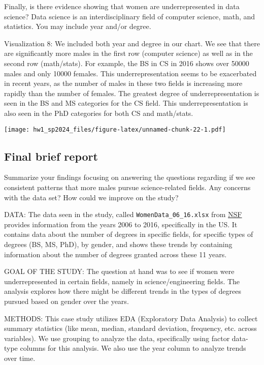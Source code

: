 \documentclass[
]{article}
\begin{document}
Finally, is there evidence showing that women are underrepresented in
data science? Data science is an interdisciplinary field of computer
science, math, and statistics. You may include year and/or degree.

Visualization 8: We included both year and degree in our chart. We see
that there are significantly more males in the first row (computer
science) as well as in the second row (math/stats). For example, the BS
in CS in 2016 shows over 50000 males and only 10000 females. This
underrepresentation seems to be exacerbated in recent years, as the
number of males in these two fields is increasing more rapidly than the
number of females. The greatest degree of underrepresentation is seen in
the BS and MS categories for the CS field. This underrepresentation is
also seen in the PhD categories for both CS and math/stats.

\texttt{[image: hw1\_sp2024\_files/figure-latex/unnamed-chunk-22-1.pdf]}

\hypertarget{final-brief-report}{%
\subsection{Final brief report}\label{final-brief-report}}

Summarize your findings focusing on answering the questions regarding if
we see consistent patterns that more males pursue science-related
fields. Any concerns with the data set? How could we improve on the
study?

DATA: The data seen in the study, called \texttt{WomenData\_06\_16.xlsx}
from
\href{https://ncses.nsf.gov/pubs/nsf19304/digest/field-of-degree-women}{NSF}
provides information from the years 2006 to 2016, specifically in the
US. It contains data about the number of degrees in specific fields, for
specific types of degrees (BS, MS, PhD), by gender, and shows these
trends by containing information about the number of degrees granted
across these 11 years.

GOAL OF THE STUDY: The question at hand was to see if women were
underrepresented in certain fields, namely in science/engineering
fields. The analysis explores how there might be different trends in the
types of degrees pursued based on gender over the years.

METHODS: This case study utilizes EDA (Exploratory Data Analysis) to
collect summary statistics (like mean, median, standard deviation,
frequency, etc. across variables). We use grouping to analyze the data,
specifically using factor data-type columns for this analysis. We also
use the year column to analyze trends over time.
\end{document}

